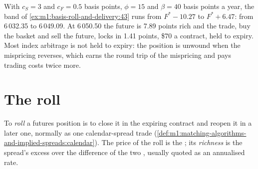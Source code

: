 \begin{example}\label{ex:m1:basis-roll-and-delivery:band}
With $c_S = 3$ and $c_F = 0.5$ basis points, $\phi = 15$ and $\beta = 40$ basis
points a year, the band of \cref{ex:m1:basis-roll-and-delivery:43} runs from
$F^* - 10.27$ to $F^* + 6.47$: from 6\,032.35 to 6\,049.09. At 6\,050.50 the
future is 7.89 points rich and the trade, buy the basket and sell the future,
locks in 1.41 points, \$70 a contract, held to expiry. Most index arbitrage is
not held to expiry: the position is unwound when the mispricing reverses,
which earns the round trip of the mispricing and pays trading costs twice
more.
\end{example}

\begin{omfigure}

\label{fig:m1:basis-roll-and-delivery:mispricing}
\end{omfigure}

\section{The roll}

\begin{definition}[Roll]\label{def:m1:basis-roll-and-delivery:roll}
To \emph{roll} a futures position is to close it in the expiring
contract and reopen it in a later one, normally as one calendar-spread trade
(\cref{def:m1:matching-algorithms-and-implied-spreads:calendar}). The price of
the roll is the ; its \emph{richness} is the spread's excess
over the difference of the two , usually quoted as an annualised
rate.
\end{definition}

